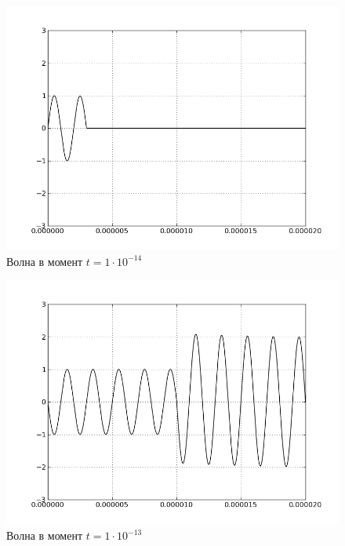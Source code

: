 \begin{figure}[!hbtp]
  \center
  \includegraphics[width=0.9\linewidth]{second}
  \caption{Волна в момент $t = 1\cdot10^{-14}$}
\end{figure}

\begin{figure}[!hbtp]
  \center
  \includegraphics[width=0.9\linewidth]{third}
  \caption{Волна в момент $t = 1\cdot10^{-13}$}
\end{figure}
